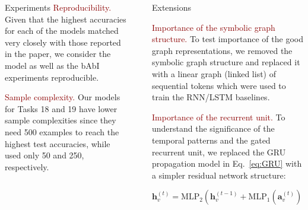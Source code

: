 \documentclass[final,hyperref={pdfpagelabels=false}]{beamer}
\newcommand{\shrink}{-15pt}
\begin{document}
\begin{frame}[t]
\begin{columns}[t]
\begin{column}{.3\textwidth}
\begin{block}{Experiments}
        \textcolor{darkred}{Reproducibility.} Given that the highest accuracies for each of the models matched very closely with those reported in the paper, we consider the model as well as the bAbI experiments reproducible.
        
        \textcolor{darkred}{Sample complexity.} Our models for Tasks 18 and 19 have lower sample complexities since they need 500 examples to reach the highest test accuracies, while~\cite{DBLP:journals/corr/LiTBZ15} used only 50 and 250, respectively.

    \end{block}
    

  \end{column} %


  \begin{column}{.02\textwidth}\end{column} %
    
  \begin{column}{.3\textwidth} %
  
  \vspace{\shrink}
    
    \begin{block}{Extensions}

      \textcolor{darkred}{Importance of the symbolic graph structure.} To test importance of the good graph representations, we removed the symbolic graph structure and replaced it with a linear graph (linked list) of sequential tokens which were used to train the RNN/LSTM baselines.
      \vspace{0.2in}
    
      \textcolor{darkred}{Importance of the recurrent unit.} To understand the significance of the temporal patterns and the gated recurrent unit, we replaced the GRU propagation model in Eq.~\eqref{eq:GRU} with a simpler residual network structure:

      \begin{equation}
        \mathbf{h}_v^{(t)} = \mathrm{MLP}_2\left( \mathbf{h}_v^{(t-1)} + \mathrm{MLP}_1\left( \mathbf{a}_v^{(t)} \right) \right),
      \end{equation}


\end{block}
\end{column}
\end{columns}
\end{frame}
\end{document}
